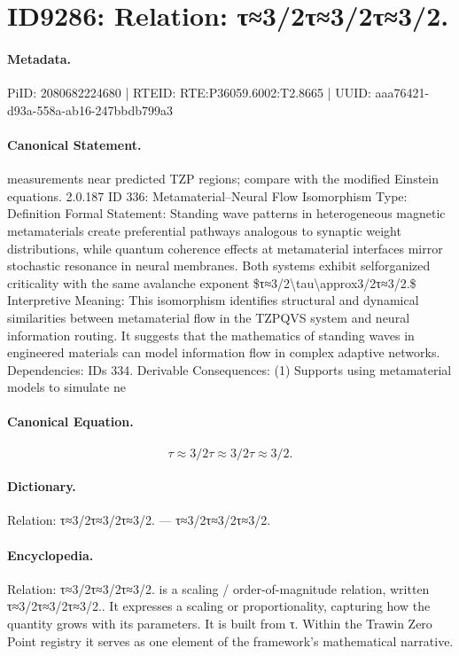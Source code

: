 \section*{ID9286: Relation: τ≈3/2τ≈3/2τ≈3/2.}
\paragraph{Metadata.}
PiID: 2080682224680 | RTEID: RTE:P36059.6002:T2.8665 | UUID: aaa76421-d93a-558a-ab16-247bbdb799a3

\paragraph{Canonical Statement.}
measurements near predicted TZP regions; compare with the modified Einstein equations. 2.0.187 ID 336: Metamaterial–Neural Flow Isomorphism Type: Definition Formal Statement: Standing wave patterns in heterogeneous magnetic metamaterials create preferential pathways analogous to synaptic weight distributions, while quantum coherence effects at metamaterial interfaces mirror stochastic resonance in neural membranes. Both systems exhibit selforganized criticality with the same avalanche exponent \$τ≈3/2\textbackslash{}tau\textbackslash{}approx3/2τ≈3/2.\$ Interpretive Meaning: This isomorphism identifies structural and dynamical similarities between metamaterial flow in the TZPQVS system and neural information routing. It suggests that the mathematics of standing waves in engineered materials can model information flow in complex adaptive networks. Dependencies: IDs 334. Derivable Consequences: (1) Supports using metamaterial models to simulate ne

\paragraph{Canonical Equation.}
\[
τ≈3/2\tau\approx3/2τ≈3/2.
\]

\paragraph{Dictionary.}
Relation: τ≈3/2τ≈3/2τ≈3/2. — τ≈3/2τ≈3/2τ≈3/2.

\paragraph{Encyclopedia.}
Relation: τ≈3/2τ≈3/2τ≈3/2. is a scaling / order-of-magnitude relation, written τ≈3/2τ≈3/2τ≈3/2.. It expresses a scaling or proportionality, capturing how the quantity grows with its parameters. It is built from τ. Within the Trawin Zero Point registry it serves as one element of the framework's mathematical narrative.
